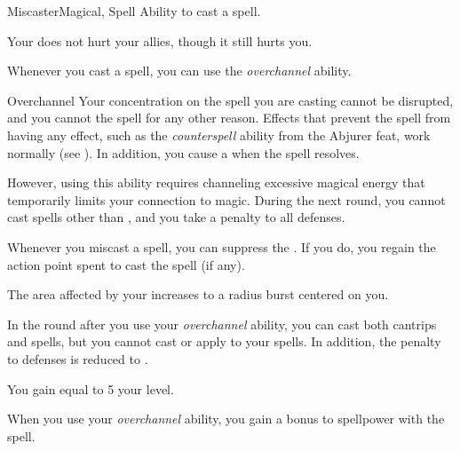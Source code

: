     \begin{feat}{Miscaster}{Magical, Spell}
        \featpre Ability to cast a spell.

         Your  does not hurt your allies, though it still hurts you.

         Whenever you cast a spell, you can use the \textit{overchannel} ability.
        \begin{ability}{Overchannel}
            Your concentration on the spell you are casting cannot be disrupted, and you cannot  the spell for any other reason.
            Effects that prevent the spell from having any effect, such as the \textit{counterspell} ability from the Abjurer feat, work normally (see ).
            In addition, you cause a  when the spell resolves.

            However, using this ability requires channeling excessive magical energy that temporarily limits your connection to magic.
            During the next round, you cannot cast spells other than , and you take a  penalty to all defenses.
        \end{ability}

         Whenever you miscast a spell, you can suppress the .
        If you do, you regain the action point spent to cast the spell (if any).

         The area affected by your  increases to a \areamed radius burst centered on you.

         In the round after you use your \textit{overchannel} ability, you can cast both cantrips and spells, but you cannot cast  or apply  to your spells.
        In addition, the penalty to defenses is reduced to .

         You gain  equal to 5 \add your level.

         When you use your \textit{overchannel} ability, you gain a  bonus to spellpower with the spell.
    \end{feat}

